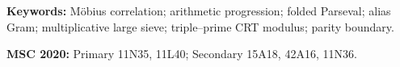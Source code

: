 \documentclass[11pt]{article}
\theoremstyle{definition}
\theoremstyle{remark}
\begin{document}
\noindent\textbf{Keywords:}
M\"obius correlation; arithmetic progression; folded Parseval; alias
Gram; multiplicative large sieve; triple--prime CRT modulus; parity
boundary.

\medskip
\noindent\textbf{MSC 2020:}
Primary 11N35, 11L40; Secondary 15A18, 42A16, 11N36.














\begingroup
\footnotesize


\endgroup
\end{document}
